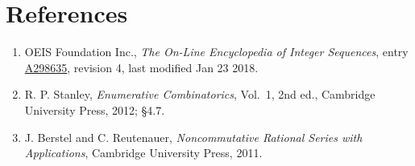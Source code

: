 \documentclass[11pt]{article}
\theoremstyle{definition}
\begin{document}
\section{References}

\begin{enumerate}

\item OEIS Foundation Inc., \emph{The On-Line Encyclopedia of Integer Sequences}, entry \href{https://oeis.org/A298635}{A298635}, revision 4, last modified Jan 23 2018.

\item R. P. Stanley, \emph{Enumerative Combinatorics}, Vol.~1, 2nd ed., Cambridge University Press, 2012; \S4.7.

\item J. Berstel and C. Reutenauer, \emph{Noncommutative Rational Series with Applications}, Cambridge University Press, 2011.

\end{enumerate}
\end{document}
